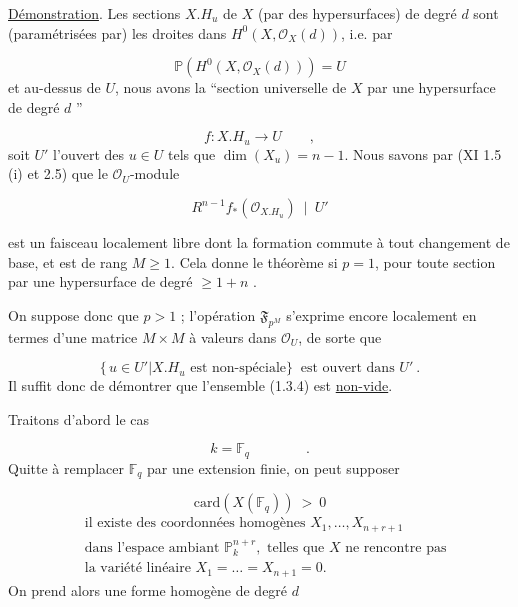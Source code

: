 \underline{Démonstration}. Les sections $X.H_u$ de $X$ (par des hypersurfaces) de degré $d$ sont (paramétrisées par) les droites dans $H^0(X,\mathcal{O}_X(d))$, i.e. par

\begin{equation}\tag{1.3.1}
\mathbb{P}(H^0(X,\mathcal{O}_X(d))) = U
\end{equation}
et au-dessus de $U$, nous avons la ``section universelle de $X$ par une hypersurface de degré $d$ ''

\begin{equation}\tag{1.3.2}
f : X.H_u \longrightarrow U \qquad ,
\end{equation}
soit $U'$ l'ouvert des $u \in U$ tels que $\dim(X_u) = n-1$. Nous savons par (XI 1.5 (i) et 2.5) que le $\mathcal{O}_U$-module

\begin{equation}\tag{1.3.3}
R^{n-1}f_*(\mathcal{O}_{X.H_u}) \ \mid \ U' 
\end{equation}


 est un faisceau localement libre dont la formation commute à tout changement de base, et est de rang $M \geq 1$. Cela donne le théorème si $p = 1$, pour toute section par une hypersurface de degré $\geq 1+n$ .

On suppose donc que $p > 1$ ; l'opération $\mathfrak{F}_{p^M}$ s'exprime encore localement en termes d'une matrice $M \times M$ à valeurs dans $\mathcal{O}_U$, de sorte que

\begin{equation}\tag{1.3.4}
\{ \, u \in U' | X.H_u \text{ est non-spéciale} \} \ \text{ est ouvert dans } U' \ .
\end{equation}
Il suffit donc de démontrer que l'ensemble (1.3.4) est \underline{non-vide}.

Traitons d'abord le cas

\begin{equation}\tag{1.3.5}
k = \mathbb{F}_q \qquad\qquad .
\end{equation}
Quitte à remplacer $\mathbb{F}_q$ par une extension finie, on peut supposer

\begin{equation}\tag{1.3.6}
\mathrm{card}(X(\mathbb{F}_q)) \ > \ 0
\end{equation}
\begin{equation}\tag{1.3.7}
\begin{aligned}
&\text{il existe des coordonnées homogènes } X_1,\dots,X_{n+r+1} \\
&\text{dans l'espace ambiant } \mathbb{P}^{n+r}_k, \text{ telles que } X \text{ ne rencontre pas} \\
&\text{la variété linéaire } X_1=\dots=X_{n+1}=0.
\end{aligned}
\end{equation}
On prend alors une forme homogène de degré $d$

